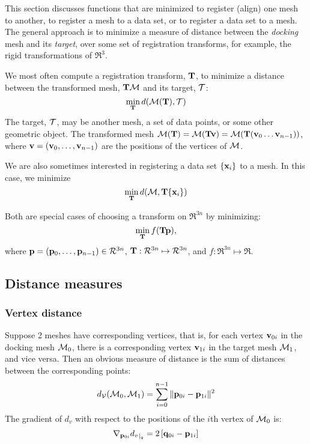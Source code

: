 \label{sec:registration}

This section discusses functions that are minimized
to register (align) one mesh to another,
to register a mesh to a data set,
or to register a data set to a mesh.
The general approach is to minimize
a measure of distance between the {\it docking} mesh and its {\it target},
over some set of registration transforms,
for example, the rigid transformations of $\Re^3$.

We most often compute a registration transform, ${\mathbf T}$,
to minimize a distance between the transformed mesh,
${\mathbf T}{\mathcal M}$ and its target, ${\mathcal T}$:
\begin{equation}
\min_{{\mathbf T}} d({\mathcal M}({\mathbf T}),{\mathcal T})
\end{equation}
The target, ${\mathcal T}$, may be another mesh, a set of data points,
or some other geometric object.
The transformed mesh
${\mathcal M}({\mathbf T}) = {\mathcal M}({\mathbf T}{\mathbf v}) = {\mathcal M}({\mathbf T}({\mathbf v}_0 \ldots {\mathbf v}_{n-1}))$,
where ${\mathbf v} = ({\mathbf v}_0, \ldots , {\mathbf v}_{n-1})$
are the positions of the vertices of ${\mathcal M}$.

We are also sometimes interested in registering a data set
$\{{\mathbf x}_i\}$ to a mesh.
In this case, we minimize
\begin{equation}
\min_{{\mathbf T}} d({\mathcal M},{\mathbf T}\{{\mathbf x}_i\})
\end{equation}

Both are special cases of choosing a transform on $\Re^{3n}$
by minimizing:
\begin{equation}
\min_{{\mathbf T}} f( {\mathbf T} {\mathbf p}),
\end{equation}
where
${\mathbf p} = ({\mathbf p}_0, \ldots , {\mathbf p}_{n-1}) \in \mathcal{R}^{3n}$,
${\mathbf T} : \mathcal{R}^{3n} \mapsto \mathcal{R}^{3n}$,
and
$f : \Re^{3n} \mapsto \Re$.

\subsection{Distance measures}
\label{sec:Distance-measures}

\subsubsection{Vertex distance}
\label{sec:Vertex-distance}

Suppose 2 meshes have corresponding vertices,
that is,
for each vertex ${\mathbf v}_{0i}$ in the docking mesh ${\mathcal M}_0$,
there is a corresponding vertex ${\mathbf v}_{1i}$ in the target mesh ${\mathcal M}_1$,
and vice versa.
Then an obvious measure of distance
is the sum of distances between the corresponding points:
\begin{equation}
d_{{\mathcal V}}({\mathcal M}_0,{\mathcal M}_1) = \sum_{i=0}^{n-1} \| {\mathbf p}_{0i} - {\mathbf p}_{1i} \|^2
\end{equation}
The gradient of $d_v$ with respect to the positions
of the $i$th vertex of ${\mathcal M}_0$ is:
\begin{equation}
{\mathbf \nabla}_{{\mathbf p}_{0i}}{{d_v}}_{\mid_{q}} = 2 \left[ {\mathbf q}_{0i} - {\mathbf p}_{1i} \right]
\end{equation}

